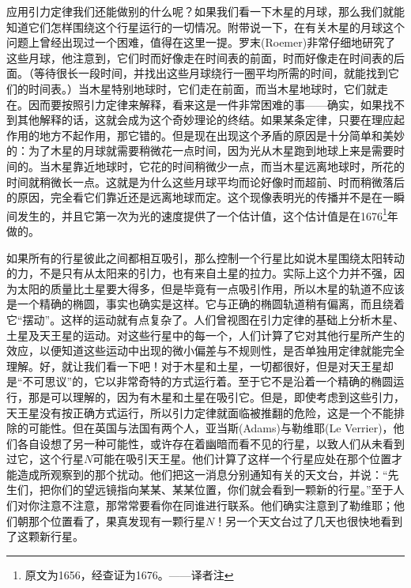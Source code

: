 \documentclass[12pt,oneside]{book}
\begin{document}
\begin{common-format}
应用引力定律我们还能做别的什么呢？如果我们看一下木星的月球，那么我们就能知道它们怎样围绕这个行星运行的一切情况。附带说一下，在有关木星的月球这个问题上曾经出现过一个困难，值得在这里一提。罗末(Roemer)非常仔细地研究了这些月球，他注意到，它们时而好像走在时间表的前面，时而好像走在时间表的后面。（等待很长一段时间，并找出这些月球绕行一圈平均所需的时间，就能找到它们的时间表。）当木星特别地球时，它们走在前面，而当木星地球时，它们就走在。因而要按照引力定律来解释，看来这是一件非常困难的事——确实，如果找不到其他解释的话，这就会成为这个奇妙理论的终结。如果某条定律，只要在理应起作用的地方不起作用，那它错的。但是现在出现这个矛盾的原因是十分简单和美妙的：为了木星的月球就需要稍微花一点时间，因为光从木星跑到地球上来是需要时间的。当木星靠近地球时，它花的时间稍微少一点，而当木星远离地球时，所花的时间就稍微长一点。这就是为什么这些月球平均而论好像时而超前、时而稍微落后的原因，完全看它们靠近还是远离地球而定。这个现像表明光的传播并不是在一瞬间发生的，并且它第一次为光的速度提供了一个估计值，这个估计值是在1676\footnote{原文为1656，经查证为1676。——译者注}年做的。

如果所有的行星彼此之间都相互吸引，那么控制一个行星比如说木星围绕太阳转动的力，不是只有从太阳来的引力，也有来自土星的拉力。实际上这个力并不强，因为太阳的质量比土星要大得多，但是毕竟有一点吸引作用，所以木星的轨道不应该是一个精确的椭圆，事实也确实是这样。它与正确的椭圆轨道稍有偏离，而且绕着它“摆动”。这样的运动就有点复杂了。人们曾视图在引力定律的基础上分析木星、土星及天王星的运动。对这些行星中的每一个，人们计算了它对其他行星所产生的效应，以便知道这些运动中出现的微小偏差与不规则性，是否单独用定律就能完全理解。好，就让我们看一下吧！对于木星和土星，一切都很好，但是对天王星却是“不可思议”的，它以非常奇特的方式运行着。至于它不是沿着一个精确的椭圆运行，那是可以理解的，因为有木星和土星在吸引它。但是，即使考虑到这些引力，天王星没有按正确方式运行，所以引力定律就面临被推翻的危险，这是一个不能排除的可能性。但在英国与法国有两个人，亚当斯(Adams)与勒维耶(Le Verrier)，他们各自设想了另一种可能性，或许存在着幽暗而看不见的行星，以致人们从未看到过它，这个行星$N$可能在吸引天王星。他们计算了这样一个行星应处在那个位置才能造成所观察到的那个扰动。他们把这一消息分别通知有关的天文台，并说：“先生们，把你们的望远镜指向某某、某某位置，你们就会看到一颗新的行星。”至于人们对你注意不注意，那常常要看你在同谁进行联系。他们确实注意到了勒维耶；他们朝那个位置看了，果真发现有一颗行星$N$！另一个天文台过了几天也很快地看到了这颗新行星。


\end{common-format}
\end{document}
